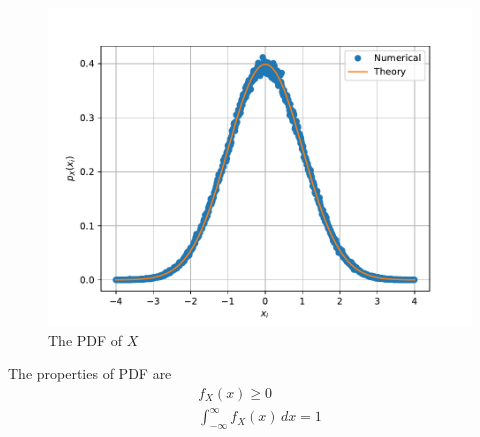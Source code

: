 \documentclass[journal,10pt,twocolumn]{IEEEtran}
\begin{document}
\begin{enumerate}
\begin{figure}[H]
\centering
\includegraphics[width=\columnwidth]{gauss_pdf.pdf}
\caption{The PDF of $X$}
\label{fig:gauss_pdf}
\end{figure}

The properties of PDF are
\begin{eqnarray}
	f_X(x) \ge 0\\
	\int_{-\infty}^{\infty} f_X(x) \,dx = 1
\end{eqnarray}


\end{enumerate}
\end{document}
